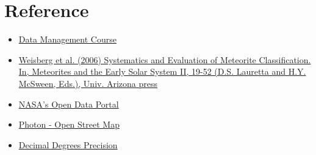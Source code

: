 \documentclass[conference]{IEEEtran}
\begin{document}
	\section{Reference}
	\begin{itemize}
		\item \href{https://www.diag.uniroma1.it/~lenzerin/index.html/?q=node/53}{Data Management Course}
		\item \href{https://web.pdx.edu/~ruzickaa/meteorites/papers/WeisbergEtal2006-classification.pdf}{Weisberg et al. (2006) Systematics and Evaluation of Meteorite Classification. In, Meteorites and the Early Solar System II, 19-52 (D.S. Lauretta and H.Y. McSween, Eds.), Univ. Arizona press}
		\item \href{https://data.nasa.gov/Space-Science/Meteorite-Landings/gh4g-9sfh/about_data}{NASA's Open Data Portal}
		\item \href{https://photon.komoot.io/}{Photon - Open Street Map}
		\item \href{https://en.wikipedia.org/wiki/Decimal_degrees#Precision}{Decimal Degrees Precision}
	\end{itemize}
\end{document}
